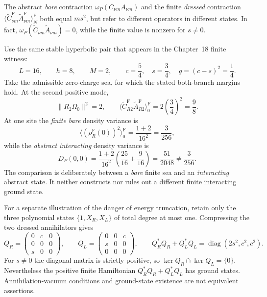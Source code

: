 The abstract \emph{bare} contraction
$\omega_P(C_{\nu m}A_{\nu m})$ and the finite \emph{dressed}
contraction
$\langle\widetilde C_{\nu m}^{\mathrm F}\widetilde A_{\nu m}^{\mathrm F}\rangle_N^{\mathrm F}$
both equal $ms^2$, but refer to different operators in different
states.  In fact,
$\omega_P(\widetilde C_{\nu m}\widetilde A_{\nu m})=0$,
while the finite value is nonzero for $s\ne0$.

\begin{example}
\label{ex:ch19-comp-16-sites}

Use the same stable hyperbolic pair that appears in the Chapter~18
finite witness:
\[
 L=16,\qquad h=8,\qquad M=2,\qquad
 c=\frac54,\quad s=\frac34,\quad g=(c-s)^2=\frac14.
\]
Take the admissible zero-charge sea, for which the stated
both-branch margins hold.  At the second positive mode,
\begin{equation}
 \|R_2\Omega_0\|^2=2,
 \qquad
 \langle\widetilde C_{R2}^{\mathrm F}
          \widetilde A_{R2}^{\mathrm F}\rangle_0^{\mathrm F}
 =2\left(\frac34\right)^2=\frac98.
 \label{eq:ch19-comp-example-dressed}
\end{equation}
At one site the \emph{finite bare} density variance is
\begin{equation}
 \langle(\rho_R^{\mathrm F}(0))^2\rangle_0^{\mathrm F}
   =\frac{1+2}{16^2}=\frac3{256},
 \label{eq:ch19-comp-example-free}
\end{equation}
while the \emph{abstract interacting} density variance is
\begin{equation}
 D_P(0,0)=\frac{1+2}{16^2}
 \left(\frac{25}{16}+\frac9{16}\right)
 =\frac{51}{2048}\ne\frac3{256}.
 \label{eq:ch19-comp-example-abstract}
\end{equation}
The comparison is deliberately between a \emph{bare} finite sea
and an \emph{interacting} abstract state.  It neither constructs nor
rules out a different finite interacting ground state.
\end{example}

For a separate illustration of the danger of energy truncation,
retain only the three polynomial states
$\{1,X_R,X_L\}$ of total degree at most one.  Compressing the
two dressed annihilators gives
\[
 Q_R=\begin{pmatrix}0&c&0\\0&0&0\\s&0&0\end{pmatrix},
 \qquad
 Q_L=\begin{pmatrix}0&0&c\\s&0&0\\0&0&0\end{pmatrix},
 \qquad
 Q_R^*Q_R+Q_L^*Q_L
   =\operatorname{diag}(2s^2,c^2,c^2).
\]
For $s\ne0$ the diagonal matrix is strictly positive, so
$\ker Q_R\cap\ker Q_L=\{0\}$.  Nevertheless the positive
finite Hamiltonian $Q_R^*Q_R+Q_L^*Q_L$ has ground states.
Annihilation-vacuum conditions and ground-state existence are
not equivalent assertions.

